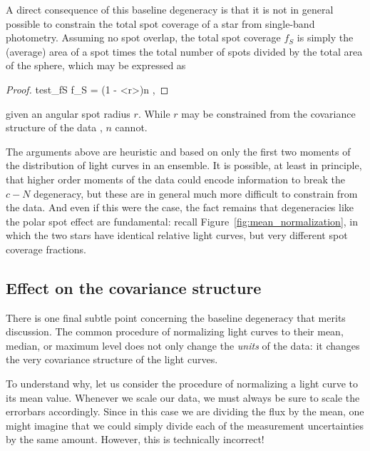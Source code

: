\documentclass[modern]{aastex62}
\begin{document}
A direct consequence of this baseline degeneracy is that it is not in general
possible to constrain the total spot coverage of a star from
single-band photometry. Assuming no spot overlap, the total spot coverage $f_S$
is simply the (average) area of a spot
times the total number of spots divided by the total area of the sphere, which
may be expressed as
%
\begin{proof}{test_fS}
    \label{eq:fS}
    f_S = \left(1 - \left<\cos r\right>\right)n
    \quad,
\end{proof}
%
given an angular spot radius $r$.
While $r$ may be constrained from the covariance structure of the data
, $n$ cannot.

The arguments above are heuristic and based on only the first two moments
of the distribution of light curves in an ensemble.
It is possible, at least in principle, that higher order moments of the data
could encode information to
break the $c-N$ degeneracy, but these are in general much more difficult
to constrain from the data. And even if this were the case, the fact remains
that degeneracies like the polar spot effect are fundamental: recall
Figure~\ref{fig:mean_normalization}, in which the two stars
have identical relative light curves, but very different spot coverage
fractions.

\subsection{Effect on the covariance structure}
\label{sec:covariance}

There is one final subtle point concerning the baseline degeneracy that merits discussion.
The common procedure of normalizing light curves to their mean, median, or
maximum level does not only change the \emph{units} of the data: it changes
the very covariance structure of the light curves.

To understand why, let us consider the procedure of normalizing a light curve
to its mean value. Whenever we scale our data, we must always be sure to
scale the errorbars accordingly. Since in this case we are dividing the
flux by the mean, one might imagine that we could simply divide each of
the measurement uncertainties by the same amount. However,
this is technically incorrect!
\end{document}
